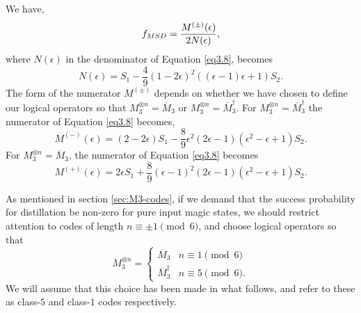 \documentclass[11pt]{article}
\begin{document}
We have,
\begin{equation}
f_{\rm MSD} = \frac{M^{(\pm)}(\epsilon)}{2N(\epsilon)},
\label{eq3.8}
\end{equation}
where
$N(\epsilon)$ in the denominator of Equation \eqref{eq3.8}, becomes
\begin{dmath}
    N(\epsilon)=S_1 -\frac{4}{9}(1-2 \epsilon )^2 ((\epsilon -1) \epsilon +1)S_2.
\end{dmath}
The form of the numerator $M^{(\pm)}$ depends on whether we have chosen to define our logical operators so that $M_3^{\otimes n}=\overline{M}_3$ or $M_3^{\otimes n}=\overline{M}_3^\dagger$. For $M_3^{\otimes n}=\overline{M}_3^\dagger$ the numerator of Equation \eqref{eq3.8} becomes, 
\begin{dmath}
M^{(-)}(\epsilon)= (2-2\epsilon)S_1 - \frac{8}{9} \epsilon ^2 (2 \epsilon-1) (\epsilon ^2-\epsilon +1) S_2.
\end{dmath}
For $M_3^{\otimes n}=\overline{M}_3$, the numerator of Equation \eqref{eq3.8} becomes 
\begin{dmath}
M^{(+)}(\epsilon)=2\epsilon S_1 + \frac{8}{9} (\epsilon -1)^2 (2 \epsilon -1) \left(\epsilon ^2-\epsilon +1\right) S_2.
\end{dmath}

As mentioned in section \ref{sec:M3-codes}, if we demand that the success probability for distillation be non-zero for pure input magic states, we should restrict attention to codes of length $n \equiv \pm 1 \pmod 6$, and choose logical operators so that
\begin{equation}
    M_3^{\otimes n}= \begin{cases}
        \overline{M}_3 & n \equiv 1 \pmod 6 \\
        \overline{M}_3^\dagger & n \equiv 5 \pmod 6.
    \end{cases} \label{M3-choice}
\end{equation} We will assume that this choice has been made in what follows, and refer to these as class-$5$ and class-$1$ codes respectively.
\end{document}
